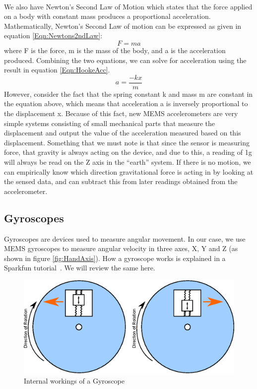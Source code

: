 \hfill \\
We also have Newton's Second Law of Motion
which states that the force applied on a body with constant mass produces a proportional acceleration.
Mathematically, Newton's Second Law of motion can be expressed as given in equation \ref{Eqn:Newtons2ndLaw}:
\begin{equation}
\label{Eqn:Newtons2ndLaw}
F = ma 
\end{equation}
where F is the force, m is the mass of the body, and a is the acceleration produced. Combining the two equations, we can solve for acceleration using the result in equation \ref{Eqn:HookeAcc}.
\begin{equation}
\label{Eqn:HookeAcc}
a = \frac{-kx}{m} 
\end{equation}
However, consider the fact that the spring constant k and mass m are constant in the equation above, which means that acceleration a is inversely proportional to the displacement x. Because of this fact, new MEMS accelerometers are very simple systems consisting of small mechanical parts that measure the displacement and output the value of the acceleration measured based on this displacement.
Something that we must note is that since the sensor is measuring force, that gravity is always acting on the device,
and due to this, a reading of 1g will always be read on the Z axis in the ``earth'' system.
If there is no motion, we can empirically know which direction gravitational force is acting in by looking at the sensed data,
and can subtract this from later readings obtained from the accelerometer.

\subsection{Gyroscopes}
\label{Sec:Gyroscope}

Gyroscopes are devices used to measure angular movement. In our case, we use MEMS gyroscopes to measure angular velocity in three axes, X, Y and Z (as shown in figure \ref{fig:HandAxis}). How a gyroscope works is explained in a Sparkfun tutorial~\cite{Web:SparkfunGyros}. We will review the same here.
\begin{figure}
\begin{center}
\includegraphics{images/GyroWork.eps}
\caption{Internal workings of a Gyroscope}
\label{fig:GyroDiag}
\end{center}
\end{figure}

